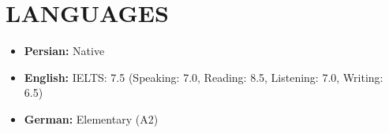 \documentclass[11pt,a4paper,sans]{moderncv}        %
\begin{document}
\vspace{2pt}

\section{LANGUAGES}

\vspace{1pt}

\begin{itemize}

\item \textbf{Persian:} Native

\vspace{1pt}

\item \textbf{English:} IELTS: 7.5 (Speaking: 7.0, Reading: 8.5, Listening: 7.0, Writing: 6.5)

\vspace{1pt}

\item \textbf{German:} Elementary (A2)

\end{itemize}












\nocite{*}



\end{document}
